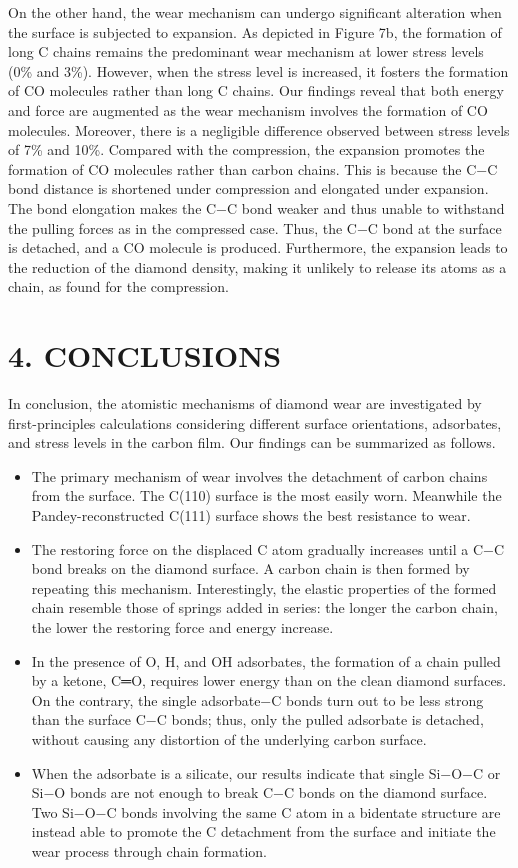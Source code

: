 \documentclass{article}
\begin{document}
On the other hand, the wear mechanism can undergo significant alteration when the surface is subjected to expansion. As depicted in Figure 7b, the formation of long C chains remains the predominant wear mechanism at lower stress levels (0\% and 3\%). However, when the stress level is increased, it fosters the formation of CO molecules rather than long C chains. Our findings reveal that both energy and force are augmented as the wear mechanism involves the formation of CO molecules. Moreover, there is a negligible difference observed between stress levels of 7\% and 10\%. Compared with the compression, the expansion promotes the formation of CO molecules rather than carbon chains. This is because the C−C bond distance is shortened under compression and elongated under expansion. The bond elongation makes the C−C bond weaker and thus unable to withstand the pulling forces as in the compressed case. Thus, the C−C bond at the surface is detached, and a CO molecule is produced. Furthermore, the expansion leads to the reduction of the diamond density, making it unlikely to release its atoms as a chain, as found for the compression.

\section*{4. CONCLUSIONS}

In conclusion, the atomistic mechanisms of diamond wear are investigated by first-principles calculations considering different surface orientations, adsorbates, and stress levels in the carbon film. Our findings can be summarized as follows.
\begin{itemize}
\item The primary mechanism of wear involves the detachment of carbon chains from the surface. The C(110) surface is the most easily worn. Meanwhile the Pandey-reconstructed C(111) surface shows the best resistance to wear.
\item The restoring force on the displaced C atom gradually increases until a C−C bond breaks on the diamond surface. A carbon chain is then formed by repeating this mechanism. Interestingly, the elastic properties of the formed chain resemble those of springs added in series: the longer the carbon chain, the lower the restoring force and energy increase.
\item In the presence of O, H, and OH adsorbates, the formation of a chain pulled by a ketone, C═O, requires lower energy than on the clean diamond surfaces. On the contrary, the single adsorbate−C bonds turn out to be less strong than the surface C−C bonds; thus, only the pulled adsorbate is detached, without causing any distortion of the underlying carbon surface.
\item When the adsorbate is a silicate, our results indicate that single Si−O−C or Si−O bonds are not enough to break C−C bonds on the diamond surface. Two Si−O−C bonds involving the same C atom in a bidentate structure are instead able to promote the C detachment from the surface and initiate the wear process through chain formation.
\end{itemize}
\end{document}
